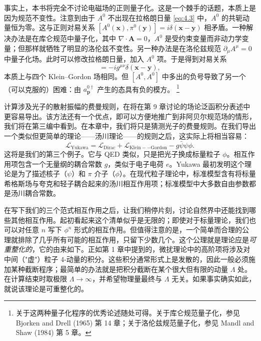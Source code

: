 事实上，本书将完全不讨论电磁场的正则量子化。这是一个棘手的话题，本质上是因为规范不变性。注意到由于 $A^0$ 不出现在拉格朗日量 \eqref{eq:4.3} 中，$A^0$ 的共轭动量恒为零。这与正则对易关系 $[A^0(\mathbf{x}), \pi^0(\mathbf{y})] = i\delta(\mathbf{x}-\mathbf{y})$ 相矛盾。一种解决办法是在库仑规范中量子化，其中 $\nabla\cdot\mathbf{A} = 0$，$A^0$ 是受约束变量而非动力学变量；但那样就牺牲了明显的洛伦兹不变性。另一种办法是在洛伦兹规范 $\partial_\mu A^\mu = 0$ 中量子化场。此时可以修改拉格朗日量，加入 $A^0$ 项。于是得到对易关系
\begin{equation}
  [A^\mu(\mathbf{x}), A^\nu(\mathbf{y})] = -ig^{\mu\nu}\delta(\mathbf{x}-\mathbf{y}),
\end{equation}
本质上与四个 Klein--Gordon 场相同。但 $[A^0, A^0]$ 中多出的负号导致了另一个（可以克服的）困难：由 $a_{\mathbf{p}}^{0\dagger}$ 产生的态具有负的模方。%
\footnote{关于这两种量子化程序的优秀论述随处可得。关于库仑规范量子化，参见 Bjorken and Drell (1965) 第 14 章；关于洛伦兹规范量子化，参见 Mandl and Shaw (1984) 第 5 章。}

计算涉及光子的散射振幅的费曼规则，在将在第 9 章讨论的场论泛函积分表述中更容易导出。该方法还有一个优点，即可以方便地推广到非阿贝尔规范场的情形，我们将在第三编中看到。在本章中，我们将只是猜测光子的费曼规则。在我们导出一个类似但更简单的理论——汤川理论——的规则之后，这实际上将相当容易：
\begin{equation}
  \mathcal{L}_{\mathrm{Yukawa}} = \mathcal{L}_{\mathrm{Dirac}}
    + \mathcal{L}_{\mathrm{Klein--Gordon}} - g\bar{\psi}\psi\phi .
  \label{eq:4.9}
\end{equation}
这将是我们的第三个例子。它与 QED 类似，只是把光子换成标量粒子 $\phi$。相互作用项包含一个无量纲的耦合常数 $g$，类似于电子电荷 $e$。Yukawa 最初发明这个理论是为了描述核子（$\psi$）和 $\pi$ 介子（$\phi$）。在现代粒子理论中，标准模型含有将标量希格斯场与夸克和轻子耦合起来的汤川相互作用项；标准模型中大多数自由参数都是汤川耦合常数。

在写下我们的三个范式相互作用之后，让我们稍停片刻，讨论自然界中还能找到哪些其他相互作用。起初看起来这个清单似乎是无限的；即使对于标量理论，我们也可以对任意 $n$ 写下 $\phi^n$ 形式的相互作用。但值得注意的是，一个简单而合理的公理就排除了几乎所有可能的相互作用，只留下少数几个。这个公理就是理论应是\emph{可重整化的}，它的由来如下。正如第 1 章中提到的，微扰理论中的高阶项将涉及对中间（"虚"）粒子 4-动量的积分。这些积分通常形式上是发散的，因此一般必须施加某种截断程序；最简单的办法就是把积分截断在某个很大但有限的动量 $\Lambda$ 处。在计算结束时取极限 $\Lambda\to\infty$，并希望物理量最终与 $\Lambda$ 无关。如果事实确实如此，就说该理论是可重整化的。

